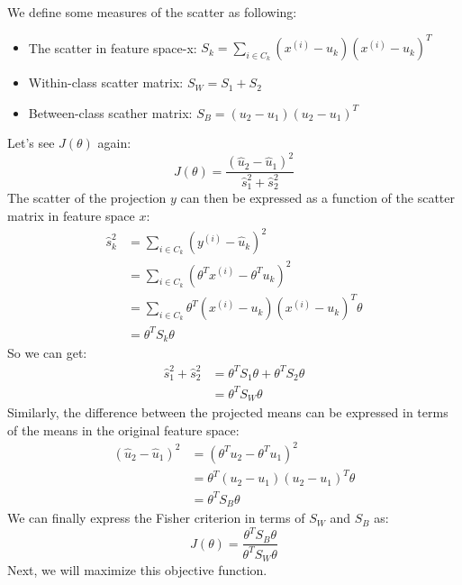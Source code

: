 \documentclass[a4paper]{article}
\begin{document}
We define some measures of the scatter as following:
\begin{itemize}
    \item The scatter in feature space-x: $  S_k = \sum_{i \in C_k} (x^{(i)} - u_k) (x^{(i)} - u_k)^{T} $ 
    \item Within-class scatter matrix: $S_W = S_1 + S_2$
    \item Between-class scather matrix: $S_B = (u_2 - u_1)(u_2 - u_1)^T$
\end{itemize}
Let's see $J(\theta)$ again:
$$
	J(\theta) = \frac{(\hat{u}_2 -\hat{u}_1)^2} {\hat{s}^{2}_1 + \hat{s}^{2}_2}
$$
The scatter of the projection $y$ can then be expressed as a function of the scatter matrix in feature space $x$:
\begin{align*}
	\hat{s}^{2}_k &= \sum_{i \in C_k} (y^{(i)}-\hat{u}_k)^2 \\
	&= \sum_{i \in C_k}(\theta^{T}x^{(i)} - \theta^{T}u_k )^2  \\
	&= \sum_{i \in C_k} \theta^{T}(x^{(i)} - u_k)(x^{(i)} - u_k)^T\theta \\
	&= \theta^T S_k \theta
\end{align*}
So we can get:
\begin{align*}
	\hat{s}^{2}_1 + \hat{s}^{2}_2 &= \theta^T S_1 \theta + \theta^T S_2 \theta \\
	&= \theta^T S_W \theta
\end{align*}
Similarly, the difference between the projected means can be expressed in terms 
of the means in the original feature space:
\begin{align*}
	(\hat{u}_2 -\hat{u}_1)^2 &= (\theta^T u_2 - \theta^T u_1)^2 \\
	&= \theta^T (u_2 - u_1)(u_2 - u_1)^T \theta \\
	&= \theta^TS_B\theta
\end{align*}
We can finally express the Fisher criterion in terms of $S_W$ and $S_B$ as:
$$
	J(\theta) = \frac{\theta^T S_B \theta} {\theta^T S_W \theta}
$$
Next, we will maximize this objective function. 
\end{document}
